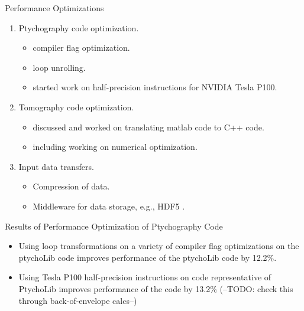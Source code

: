 \begin{frame}{Performance Optimizations}{} 
\begin{enumerate}
\item Ptychography code optimization.
\begin{itemize}
\small \item \small compiler flag optimization.
\item \small loop unrolling. 
\item \small started work on half-precision instructions for NVIDIA Tesla P100. 
\end{itemize}
\item Tomography code optimization. 
\begin{itemize} 
\small \item \small discussed and worked on translating matlab code to C++ code.
\item \small including working on numerical optimization.
\end{itemize}
\item Input data transfers. 
\begin{itemize} 
\small \item \small Compression of data. 
\item \small Middleware for data storage, e.g., HDF5 .  
\end{itemize} 
\end{enumerate} 
\end{frame}



\begin{frame}{Results of Performance Optimization of Ptychography Code}
\begin{itemize}
\item Using loop transformations on a variety of compiler flag optimizations on the ptychoLib code improves performance of the
ptychoLib code by 12.2\%. 
\item Using Tesla P100 half-precision instructions on code
  representative of PtychoLib improves performance of the code by
  13.2\% (--TODO: check this through back-of-envelope calcs--)
\end{itemize}
\end{frame}

